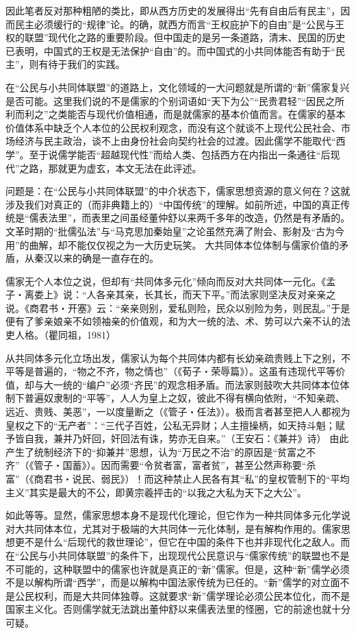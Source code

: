 \documentclass[a4paper,12pt,punct=kaiming]{ctexart}
\begin{document}
因此笔者反对那种粗陋的类比，即从西方历史的发展得出“先有自由后有民主”，因而民主必须缓行的“规律”论。的确，就西方而言“王权庇护下的自由”是“公民与王权的联盟”现代化之路的重要阶段。但中国走的是另一条道路，清末、民国的历史已表明，中国式的王权是无法保护“自由”的。而中国式的小共同体能否有助于“民主”，则有待于我们的实践。

在“公民与小共同体联盟”的道路上，文化领域的一大问题就是所谓的“新”儒家复兴是否可能。这里我们说的不是儒家的个别词语如“天下为公”“民贵君轻”“因民之所利而利之”之类能否与现代价值相通，而是就儒家的基本价值而言。在儒家的基本价值体系中缺乏个人本位的公民权利观念，而没有这个就谈不上现代公民社会、市场经济与民主政治，谈不上由身份社会向契约社会的过渡。因此儒学不能取代“西学”。至于说儒学能否“超越现代性”而给人类、包括西方在内指出一条通往“后现代”之路，那就更为虚玄，本文无法在此评述。

问题是：在“公民与小共同体联盟”的中介状态下，儒家思想资源的意义何在？这就涉及我们对真正的（而非典籍上的）“中国传统”的理解。如前所述，中国的真正传统是“儒表法里”，而表里之间虽经董仲舒以来两千多年的改造，仍然是有矛盾的。文革时期的“批儒弘法”与“马克思加秦始皇”之论虽然充满了附会、影射及“古为今用”的曲解，却不能仅仅视之为一大历史玩笑。 大共同体本位体制与儒家价值的矛盾，从秦汉以来的确是一直存在的。

儒家无个人本位之说，但却有“共同体多元化”倾向而反对大共同体一元化。《孟子・离娄上》说：“人各亲其亲，长其长，而天下平。”而法家则坚决反对亲亲之说。《商君书・开塞》云：“亲亲则别，爱私则险，民众以别险为务，则民乱。”于是便有了爹亲娘亲不如领袖亲的价值观，和为大一统的法、术、势可以六亲不认的法吏人格。（瞿同祖，1981）

从共同体多元化立场出发，儒家认为每个共同体内都有长幼亲疏贵贱上下之别，不平等是普遍的，“物之不齐，物之情也”（《荀子・荣辱篇》）。这虽有违现代平等价值，却与大一统的“编户”必须“齐民”的观念相矛盾。而法家则鼓吹大共同体本位体制下普遍奴隶制的“平等”，人人为皇上之奴，彼此不得有横向依附，“不知亲疏、远近、贵贱、美恶”，一以度量断之（《管子・任法》）。极而言者甚至把人人都视为皇权之下的“无产者”：“三代子百姓，公私无异财；人主擅操柄，如天持斗魁；赋予皆自我，兼并乃奸回，奸回法有诛，势亦无自来。”（王安石：《兼并》诗） 由此产生了统制经济下的“抑兼并”思想，认为“万民之不治”的原因是“贫富之不齐”（《管子・国蓄》）。因而需要“令贫者富，富者贫”，甚至公然声称要“杀富”（《商君书・说民、弱民》）！而这种禁止人民各有其“私”的皇权管制下的“平均主义”其实是最大的不公，即黄宗羲抨击的“以我之大私为天下之大公”。

如此等等。显然，儒家思想本身不是现代化理论，但它作为一种共同体多元化学说对大共同体本位，尤其对于极端的大共同体一元化体制，是有解构作用的。儒家思想更不是什么“后现代的救世理论”，但它在中国的条件下也并非现代化之敌人。而在“公民与小共同体联盟”的条件下，出现现代公民意识与“儒家传统”的联盟也不是不可能的，这种联盟中的儒家也许就是真正的“新”儒家。但是，这种“新”儒学必须不是以解构所谓“西学”，而是以解构中国法家传统为已任的。“新”儒学的对立面不是公民权利，而是大共同体独尊。这就要求“新”儒学理论必须公民本位化，而不是国家主义化。否则儒学就无法跳出董仲舒以来儒表法里的怪圈，它的前途也就十分可疑。
\end{document}
